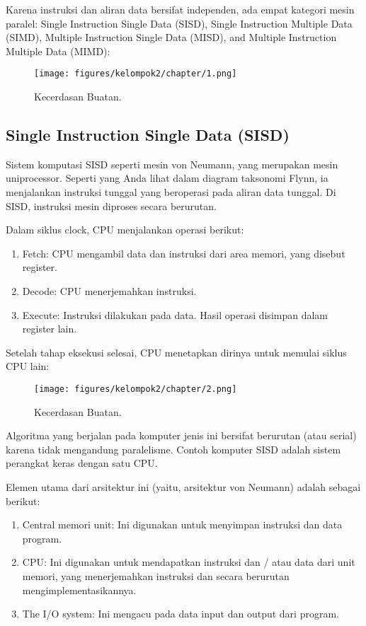 \noindent
Karena instruksi dan aliran data bersifat independen, ada empat kategori mesin paralel: Single Instruction Single Data (SISD), Single Instruction Multiple Data (SIMD), Multiple Instruction Single Data (MISD), and Multiple Instruction Multiple Data (MIMD):

\begin{figure}[H]
	\texttt{[image: figures/kelompok2/chapter/1.png]}
	\centering
	\caption{Kecerdasan Buatan.}
\end{figure}

\subsection{Single Instruction Single Data (SISD)}
Sistem komputasi SISD seperti mesin von Neumann, yang merupakan mesin uniprocessor. Seperti yang Anda lihat dalam diagram taksonomi Flynn, ia menjalankan instruksi tunggal yang beroperasi pada aliran data tunggal. Di SISD, instruksi mesin diproses secara berurutan.

\noindent
Dalam siklus clock, CPU menjalankan operasi berikut:

\begin{enumerate}
	\item Fetch: CPU mengambil data dan instruksi dari area memori, yang disebut register.
	\item Decode: CPU menerjemahkan instruksi.
	\item Execute: Instruksi dilakukan pada data. Hasil operasi disimpan dalam register lain.
\end{enumerate}

\noindent
Setelah tahap eksekusi selesai, CPU menetapkan dirinya untuk memulai siklus CPU lain:

\begin{figure}[H]
	\texttt{[image: figures/kelompok2/chapter/2.png]}
	\centering
	\caption{Kecerdasan Buatan.}
\end{figure}

\noindent
Algoritma yang berjalan pada komputer jenis ini bersifat berurutan (atau serial) karena tidak mengandung paralelisme. Contoh komputer SISD adalah sistem perangkat keras dengan satu CPU.

\noindent
Elemen utama dari arsitektur ini (yaitu, arsitektur von Neumann) adalah sebagai berikut:

\begin{enumerate}
	\item Central memori unit: Ini digunakan untuk menyimpan instruksi dan data program.
	\item CPU: Ini digunakan untuk mendapatkan instruksi dan / atau data dari unit memori, yang menerjemahkan instruksi dan secara berurutan mengimplementasikannya.
	\item The I/O system: Ini mengacu pada data input dan output dari program.
\end{enumerate}

